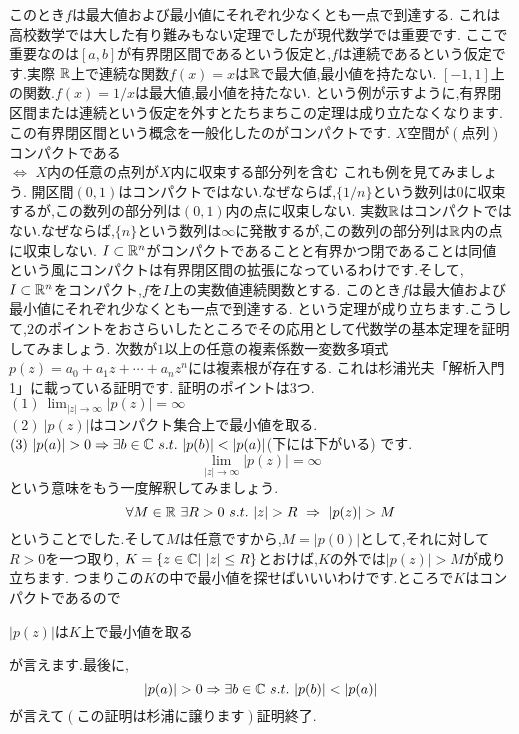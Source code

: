 このとき$f$は最大値および最小値にそれぞれ少なくとも一点で到達する.
\thmx
これは高校数学では大した有り難みもない定理でしたが現代数学では重要です.
ここで重要なのは$[a,b]$が有界閉区間であるという仮定と,$f$は連続であるという仮定です.実際
\ex[非有界]
$\mathbb R$上で連続な関数$f(x)=x$は$\mathbb R$で最大値,最小値を持たない.
\exx
\ex[不連続]
$[-1,1]$上の関数.$f(x)=1/x$は最大値,最小値を持たない.
\exx
という例が示すように,有界閉区間または連続という仮定を外すとたちまちこの定理は成り立たなくなります.
この有界閉区間という概念を一般化したのがコンパクトです.
$X$空間が$(点列)$コンパクトである\\
$\iff$
$X$内の任意の点列が$X$内に収束する部分列を含む
これも例を見てみましょう.
\ex
開区間$(0,1)$はコンパクトではない.なぜならば,$\{1/n\}$という数列は$0$に収束するが,この数列の部分列は$(0,1)$内の点に収束しない.
\exx
\ex
実数$\mathbb R$はコンパクトではない.なぜならば,$\{n\}$という数列は$\infty$に発散するが,この数列の部分列は$\mathbb R$内の点に収束しない.
\exx
\thm
$I \subset \mathbb R^n$がコンパクトであることと有界かつ閉であることは同値
\thmx
という風にコンパクトは有界閉区間の拡張になっているわけです.そして,
\thm
$I \subset \mathbb R^n$をコンパクト,$f$を$I$上の実数値連続関数とする.
このとき$f$は最大値および最小値にそれぞれ少なくとも一点で到達する.
\thmx
という定理が成り立ちます.こうして,$2$のポイントをおさらいしたところでその応用として代数学の基本定理を証明してみましょう.
\thm[代数学の基本定理]
次数が$1$以上の任意の複素係数一変数多項式$p(z)=a_0+a_1 z+\cdots + a_nz^n$には複素根が存在する.
\thmx
\proof[初等解析による証明]
これは杉浦光夫「解析入門1」に載っている証明です.
証明のポイントは3つ.\\
$(1)\ \lim_{|z|\to\infty}|p(z)| = \infty$\\
$(2)\ |p(z)|$はコンパクト集合上で最小値を取る.\\
$(3)\ |p(a)|>0 \Rightarrow \exists b \in \C \ s.t. \ |p(b)| < |p(a)|$(下には下がいる)
です.
\[
\lim_{|z|\to\infty}|p(z)| = \infty
\]
という意味をもう一度解釈してみましょう.
\[
\forall M \in \R \ \exists R>0 \ s.t. \  |z| > R \ \Rightarrow\  |p(z)|>M
\]
ということでした.そして$M$は任意ですから,$M=|p(0)|$として,それに対して$R>0$を一つ取り,
$K=\{ z\in\mathbb C |\ |z|\le R\}$とおけば,$K$の外では$|p(z)|>M$が成り立ちます.
つまりこの$K$の中で最小値を探せばいいいわけです.ところで$K$はコンパクトであるので
\begin{center}
$|p(z)|$は$K$上で最小値を取る
\end{center}
が言えます.最後に,
\[
|p(a)|>0 \Rightarrow \exists b \in \C \ s.t. \ |p(b)| < |p(a)|
\]
が言えて$(この証明は杉浦に譲ります)$証明終了.
\proofx
